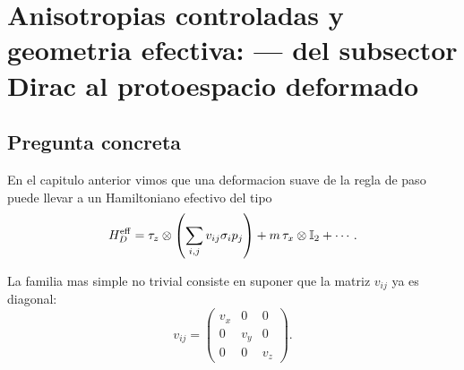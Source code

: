 \chapter{Anisotropias controladas y geometria efectiva: --- del subsector Dirac al protoespacio deformado}
\label{ch:anisotropias-geometria-efectiva}







\begin{abstract}
El paso siguiente despues de estudiar deformaciones suaves generales es fijar una familia concreta y controlable. La opcion mas limpia es permitir velocidades diferentes en las tres direcciones espaciales, \(v_x\neq v_y\neq v_z\), manteniendo linealidad infrarroja y estructura espinorial. Este documento muestra paso a paso que esa anisotropia no destruye automaticamente el sector Dirac: primero lo convierte en una version anisotropa que puede reinterpretarse geometricamente mediante una metrica espacial efectiva o, de forma mas prudente, mediante una triada efectiva. Esa reinterpretacion es importante porque conecta las deformaciones del protoespacio con una geometria infrarroja emergente sin identificar todavia esa geometria con la del espacio-tiempo fisico completo.
\end{abstract}

\section{Pregunta concreta}
En el capitulo anterior vimos que una deformacion suave de la regla de paso puede llevar a un Hamiltoniano efectivo del tipo
\begin{equation}
H_D^{\mathrm{eff}}
=
\tau_z\otimes\left(\sum_{i,j}v_{ij}\sigma_i p_j\right)
+ m\,\tau_x\otimes \mathbb{I}_2
+ \cdots.
\end{equation}

La familia mas simple no trivial consiste en suponer que la matriz \(v_{ij}\) ya es diagonal:
\begin{equation}
v_{ij}=
\begin{pmatrix}
v_x & 0 & 0\\
0 & v_y & 0\\
0 & 0 & v_z
\end{pmatrix}.
\end{equation}

